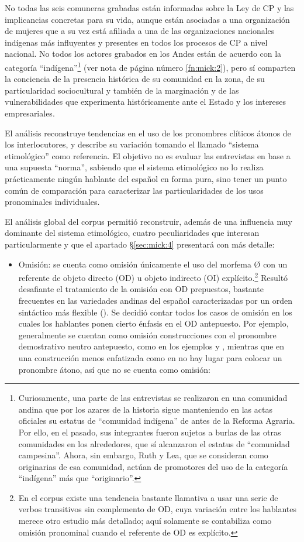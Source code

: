 \documentclass[output=paper]{../langscibook}
\begin{document}
No todas las seis comuneras grabadas están informadas sobre la Ley de CP y las implicancias concretas para su vida, aunque están asociadas a una organización de mujeres que a su vez está afiliada a una de las organizaciones nacionales indígenas más influyentes y presentes en todos los procesos de CP a nivel nacional. No todos los actores grabados en los Andes están de acuerdo con la categoría “indígena”\footnote{Curiosamente, una parte de las entrevistas se realizaron en una comunidad andina que por los azares de la historia sigue manteniendo en las actas oficiales su estatus de “comunidad indígena” de antes de la Reforma Agraria. Por ello, en el pasado, sus integrantes fueron sujetos a burlas de las otras comunidades en los alrededores, que sí alcanzaron el estatus de “comunidad campesina”. Ahora, sin embargo, Ruth y Lea, que se consideran como originarias de esa comunidad, actúan de promotores del uso de la categoría “indígena” más que “originario”.}  (ver nota de página número \ref{fn:mick:2}), pero sí comparten la conciencia de la presencia histórica de su comunidad en la zona, de su particularidad sociocultural y también de la marginación y de las vulnerabilidades que experimenta históricamente ante el Estado y los intereses empresariales.

El análisis reconstruye tendencias en el uso de los pronombres clíticos átonos de los interlocutores, y describe su variación tomando el llamado “sistema etimológico” como referencia. El objetivo no es evaluar las entrevistas en base a una supuesta “norma”, sabiendo que el sistema etimológico no lo realiza prácticamente ningún hablante del español en forma pura, sino tener un punto común de comparación para caracterizar las particularidades de los usos pronominales individuales.

El análisis global del corpus permitió reconstruir, además de una influencia muy dominante del sistema etimológico, cuatro peculiaridades que interesan particularmente y que el apartado §\ref{sec:mick:4} presentará con más detalle:

\begin{itemize}
\item Omisión: se cuenta como omisión únicamente el uso del morfema Ø con un referente de objeto directo (OD) u objeto indirecto (OI) explícito.\footnote{En el corpus existe una tendencia bastante llamativa a usar una serie de verbos transitivos sin complemento de OD, cuya variación entre los hablantes merece otro estudio más detallado; aquí solamente se contabiliza como omisión pronominal cuando el referente de OD es explícito.} Resultó desafiante el tratamiento de la omisión con OD prepuestos, bastante frecuentes en las variedades andinas del español caracterizadas por un orden sintáctico más flexible (\citealt{KleeLynch2009book}). Se decidió contar todos los casos de omisión en los cuales los hablantes ponen cierto énfasis en el OD antepuesto. Por ejemplo,
generalmente se cuentan como omisión construcciones con el pronombre demostrativo
neutro antepuesto, como en los ejemplos   y , mientras que en una construcción menos enfatizada como en  no hay lugar para colocar un pronombre átono, así que no se cuenta como omisión:
\end{itemize}
\end{document}
